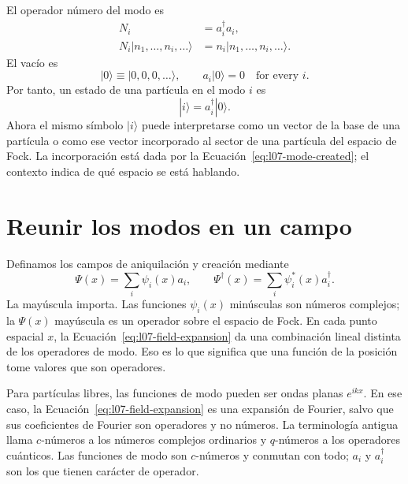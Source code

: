 El operador número del modo es
\begin{equation}
\begin{aligned}
N_i&=a_i^\dagger a_i,\\
N_i|n_1,\ldots,n_i,\ldots\rangle
&=n_i|n_1,\ldots,n_i,\ldots\rangle.
\end{aligned}
\end{equation}
El vacío es
\begin{equation}
|0\rangle\equiv|0,0,0,\ldots\rangle,
\qquad
a_i|0\rangle=0
\quad\text{for every }i.
\label{eq:l07-vacuum}
\end{equation}
Por tanto, un estado de una partícula en el modo \(i\) es
\begin{equation}
|i\rangle=a_i^\dagger|0\rangle.
\label{eq:l07-mode-created}
\end{equation}
Ahora el mismo símbolo \(|i\rangle\) puede interpretarse como un vector de la base de una partícula o como ese vector incorporado al sector de una partícula del espacio de Fock. La incorporación está dada por la Ecuación~\eqref{eq:l07-mode-created}; el contexto indica de qué espacio se está hablando.

\section{Reunir los modos en un campo}

Definamos los campos de aniquilación y creación mediante
\begin{equation}
\Psi(x)=\sum_i \psi_i(x)a_i,
\qquad
\Psi^\dagger(x)=\sum_i \psi_i^*(x)a_i^\dagger.
\label{eq:l07-field-expansion}
\end{equation}
La mayúscula importa. Las funciones \(\psi_i(x)\) minúsculas son números complejos; la \(\Psi(x)\) mayúscula es un operador sobre el espacio de Fock. En cada punto espacial \(x\), la Ecuación~\eqref{eq:l07-field-expansion} da una combinación lineal distinta de los operadores de modo. Eso es lo que significa que una función de la posición tome valores que son operadores.

Para partículas libres, las funciones de modo pueden ser ondas planas \(e^{ikx}\). En ese caso, la Ecuación~\eqref{eq:l07-field-expansion} es una expansión de Fourier, salvo que sus coeficientes de Fourier son operadores y no números. La terminología antigua llama \(c\)-números a los números complejos ordinarios y \(q\)-números a los operadores cuánticos. Las funciones de modo son \(c\)-números y conmutan con todo; \(a_i\) y \(a_i^\dagger\) son los que tienen carácter de operador.

